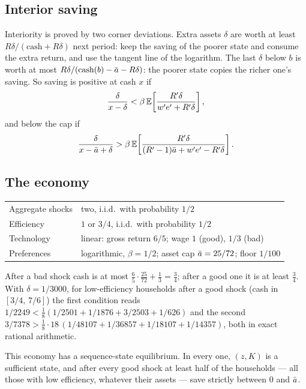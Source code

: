 \subsection{Interior saving}

Interiority is proved by two corner deviations. Extra assets $\delta$ are worth at least
$R\delta/(\text{cash}+R\delta)$ next period: keep the saving of the poorer state and consume the
extra return, and use the tangent line of the logarithm. The last $\delta$ below $b$ is worth at
most $R\delta/(\text{cash}(b)-\bar a-R\delta)$: the poorer state copies the richer one's saving. So
saving is positive at cash $x$ if
\[
  \frac{\delta}{x-\delta} < \beta\,\mathbb{E}\!\left[\frac{R'\delta}{w'e'+R'\delta}\right],
\]
and below the cap if
\[
  \frac{\delta}{x-\bar a+\delta} > \beta\,\mathbb{E}\!\left[\frac{R'\delta}{(R'-1)\bar a+w'e'-R'\delta}\right].
\]

\subsection{The economy}

\begin{center}
\begin{tabular}{ll}
\toprule
Aggregate shocks & two, i.i.d.\ with probability $1/2$ \\
Efficiency & $1$ or $3/4$, i.i.d.\ with probability $1/2$ \\
Technology & linear: gross return $6/5$; wage $1$ (good), $1/3$ (bad) \\
Preferences & logarithmic, $\beta=1/2$; asset cap $\bar a=25/72$; floor $1/100$ \\
\bottomrule
\end{tabular}
\end{center}

\noindent
After a bad shock cash is at most $\tfrac65\cdot\tfrac{25}{72}+\tfrac13=\tfrac34$; after a good
one it is at least $\tfrac34$. With $\delta=1/3000$, for low-efficiency households after a good
shock (cash in $[3/4,\,7/6]$) the first condition reads $1/2249 < \tfrac18(1/2501+1/1876+3/2503+1/626)$
and the second $3/7378 > \tfrac18\cdot18\,(1/48107+1/36857+1/18107+1/14357)$, both in exact
rational arithmetic.

\begin{theorem}\label{thm:interior}
This economy has a sequence-state equilibrium. In every one, $(z,K)$ is a sufficient state, and
after every good shock at least half of the households --- all those with low efficiency, whatever
their assets --- save strictly between $0$ and $\bar a$.
\end{theorem}

